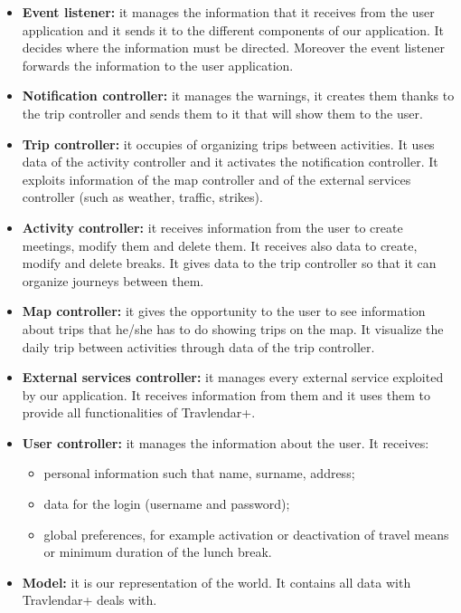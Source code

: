 \documentclass[12pt,titlepage]{article}
\begin{document}
\clearpage
\newpage

\begin{flushleft}
\begin{itemize}
\item \textbf{Event listener:} it manages the information that it receives from the user application and it sends it to the different components of our application. It decides where the information must be directed. Moreover the event listener forwards the information to the user application.
\item \textbf{Notification controller:} it manages the warnings, it creates them thanks to the trip controller and sends them to it that will show them to the user.
\item \textbf{Trip controller:} it occupies of organizing trips between activities. It uses data of the activity controller and it activates the notification controller. It exploits information of the map controller and of the external services controller (such as weather, traffic, strikes).
\item \textbf{Activity controller:} it receives information from the user to create meetings, modify them and delete them. It receives also data to create, modify and delete breaks. It gives data to the trip controller so that it can organize journeys between them.
\item \textbf{Map controller:} it gives the opportunity to the user to see information about trips that he/she has to do showing trips on the map. It visualize the daily trip between activities through data of the trip controller.
\item \textbf{External services controller:} it manages every external service exploited by our application. It receives information from them and it uses them to provide all functionalities of Travlendar+.
\item \textbf{User controller:} it manages the information about the user. It receives:
\begin{itemize}
\item personal information such that name, surname, address;
\item data for the login (username and password);
\item global preferences, for example activation or deactivation of travel means or minimum duration of the lunch break.
\end{itemize} 
\item \textbf{Model:} it is our representation of the world. It contains all data with Travlendar+ deals with.

\end{itemize}
\end{flushleft}
\end{document}
